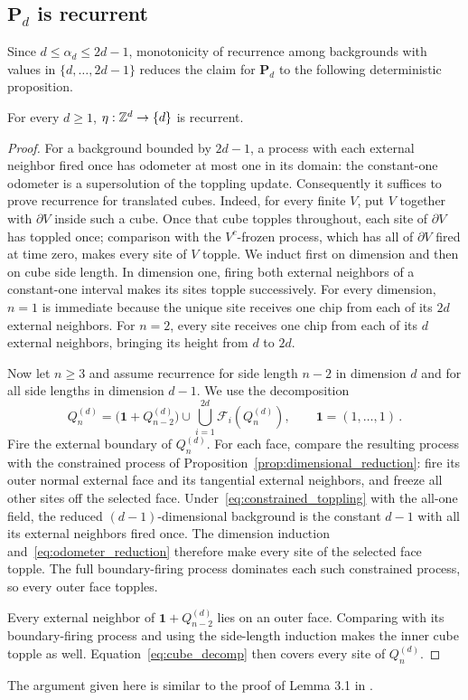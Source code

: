 \documentclass[12pt]{amsart}
\begin{document}
\subsection{\texorpdfstring{$\mathbf{P}_d$}{P_d} is recurrent}
Since $d\leq\alpha_d\leq2d-1$, monotonicity of recurrence among backgrounds with values in $\{d,\ldots,2d-1\}$ reduces the claim for $\mathbf P_d$ to the following deterministic proposition.
\begin{prop} \label{prop:recurrence}
	For every $d \geq 1$, $\eta:\mathbb{Z}^d \to \{d\}$ is recurrent.
\end{prop}
\begin{proof}
For a background bounded by $2d-1$, a process with each external neighbor fired once has odometer at most one in its domain: the constant-one odometer is a supersolution of the toppling update. Consequently it suffices to prove recurrence for translated cubes. Indeed, for every finite $V$, put $V$ together with $\partial V$ inside such a cube. Once that cube topples throughout, each site of $\partial V$ has toppled once; comparison with the $V^c$-frozen process, which has all of $\partial V$ fired at time zero, makes every site of $V$ topple.
We induct first on dimension and then on cube side length. In dimension one, firing both external neighbors of a constant-one interval makes its sites topple successively. For every dimension, $n=1$ is immediate because the unique site receives one chip from each of its $2d$ external neighbors. For $n=2$, every site receives one chip from each of its $d$ external neighbors, bringing its height from $d$ to $2d$.

Now let $n\geq3$ and assume recurrence for side length $n-2$ in dimension $d$ and for all side lengths in dimension $d-1$. We use the decomposition
\begin{equation}\label{eq:cube_decomp}
Q_n^{(d)}=\bigl(\mathbf 1+Q_{n-2}^{(d)}\bigr)
 \cup\bigcup_{i=1}^{2d}\mathcal F_i(Q_n^{(d)}),
\qquad \mathbf 1=(1,\ldots,1)\,.
\end{equation}
Fire the external boundary of $Q_n^{(d)}$. For each face, compare the resulting process with the constrained process of Proposition~\ref{prop:dimensional_reduction}: fire its outer normal external face and its tangential external neighbors, and freeze all other sites off the selected face. Under~\eqref{eq:constrained_toppling} with the all-one field, the reduced $(d-1)$-dimensional background is the constant $d-1$ with all its external neighbors fired once. The dimension induction and~\eqref{eq:odometer_reduction} therefore make every site of the selected face topple. The full boundary-firing process dominates each such constrained process, so every outer face topples.

Every external neighbor of $\mathbf 1+Q_{n-2}^{(d)}$ lies on an outer face. Comparing with its boundary-firing process and using the side-length induction makes the inner cube topple as well. Equation~\eqref{eq:cube_decomp} then covers every site of $Q_n^{(d)}$.
\end{proof}
\begin{remark}
	The argument given here is similar to the proof of Lemma 3.1 in \cite{schonmann1992behavior}.
\end{remark}
\end{document}
